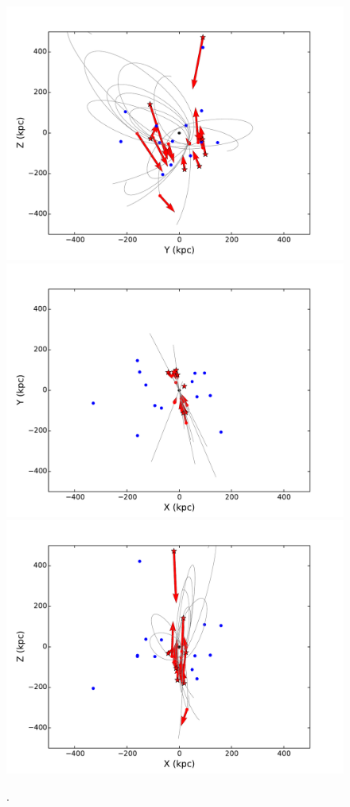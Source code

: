 \documentclass[useAMS,usenatbib]{mn2e}
\begin{document}
\begin{figure}
\includegraphics[width=\hsize]{SnapshotSatellites_All_BeforeRotationM300_yz_All_Bwd_NSIMW_3000.pdf}\\
\includegraphics[width=0.5\hsize]{SnapshotSatellites_All_BeforeRotationM300_xy_All_Bwd_NSIMW_3000.pdf}\includegraphics[width=0.5\hsize]{SnapshotSatellites_All_BeforeRotationM300_xz_All_Bwd_NSIMW_3000.pdf}\\
\caption{.}
\label{fig:StreamPlaneOrbit}
\end{figure}
\end{document}

